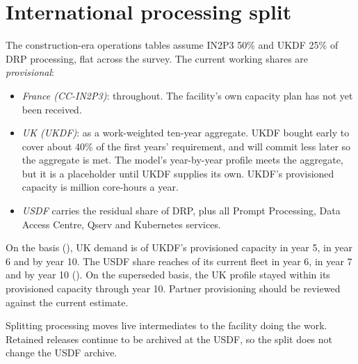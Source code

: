 \section{International processing split}\label{sec:upsplit}

The construction-era operations tables assume IN2P3 50\% and UKDF 25\% of DRP
processing, flat across the survey. The current working shares are
\emph{provisional}:

\begin{itemize}
\item \emph{France (CC-IN2P3)}: \smFrShare{} throughout. The facility's own
      capacity plan has not yet been received.
\item \emph{UK (UKDF)}: \smUkShare{} as a work-weighted ten-year aggregate.
      UKDF bought early to cover about 40\% of the first years' requirement,
      and will commit less later so the aggregate is met. The model's
      year-by-year profile meets the aggregate, but it is a placeholder until
      UKDF supplies its own. UKDF's provisioned capacity is \smUkCapM{} million
      core-hours a year.
\item \emph{USDF} carries the residual share of DRP, plus all Prompt
      Processing, Data Access Centre, Qserv and Kubernetes services.
\end{itemize}

On the \vthirty{} basis (), UK demand is
\smUkReqDRfour{} of UKDF's provisioned capacity in year 5, \smUkReqDRfive{} in
year 6 and \smUkReqDRnine{} by year 10. The USDF share reaches
\smUsdfSplitDRfive{} of its current fleet in year 6, \smUsdfSplitDRsix{} in year 7
and \smUsdfSplitDRnine{} by year 10
(). On the superseded \wfortyone{} basis, the UK profile
stayed within its provisioned capacity through year 10. Partner provisioning
should be reviewed against the current estimate.

Splitting processing moves live intermediates to the facility doing the work.
Retained releases continue to be archived at the USDF, so the split does not
change the USDF archive.



\begin{landscape}

\end{landscape}
